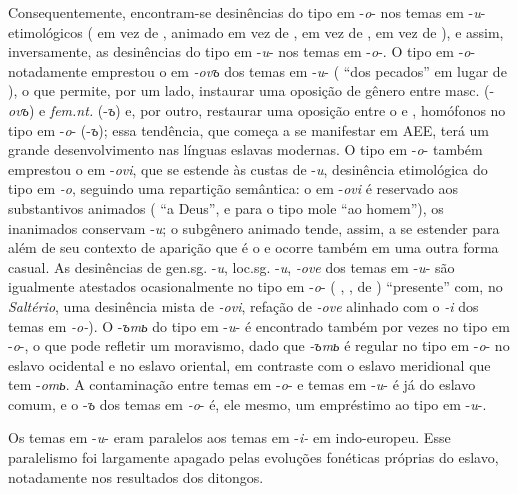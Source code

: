 Consequentemente, encontram-se desinências do tipo em -\emph{o}- nos temas em
-\emph{u}- etimológicos (  em vez de
,  animado  em vez de
,   em vez de
,   em vez de
), e assim, inversamente, as desinências do tipo em
-\emph{u}- nos temas em -\emph{o}-.
O tipo em -\emph{o}- notadamente emprestou o  em
\emph{-ovъ} dos temas em -\emph{u}- ( ``dos
pecados'' em lugar de ), o que permite, por um lado,
instaurar uma oposição de gênero entre masc. (-\emph{ovъ}) e \emph{fem.nt.}
(-\emph{ъ}) e, por outro, restaurar uma oposição entre o
 e , homófonos no tipo em -\emph{o}-
(-\emph{ъ}); essa tendência, que começa a se manifestar em AEE, terá um
grande desenvolvimento nas línguas eslavas modernas. O tipo em
-\emph{o}- também emprestou o  em -\emph{ovi}, que se estende às
custas de -\emph{u}, desinência etimológica do tipo em \emph{-o},
seguindo uma repartição semântica: o  em -\emph{ovi} é reservado aos
substantivos animados ( ``a Deus'', e para o tipo
mole   ``ao homem''), os inanimados conservam
-\emph{u}; o subgênero animado tende, assim, a se estender para além de
seu contexto de aparição que é o  e ocorre também em uma outra
forma casual. As desinências de gen.sg. -\emph{u}, loc.sg. -\emph{u},
 \emph{-ove} dos temas em -\emph{u}- são igualmente atestados
ocasionalmente no tipo em -\emph{o}- ( ,
 , de ) ``presente'' com, no
\emph{Saltério}, uma desinência mista de  \emph{-ovi}, refação de
\emph{-ove} alinhado com o \emph{-i} dos temas em \emph{-o-}). O
 -\emph{ъmь} do tipo em -\emph{u}- é encontrado também por vezes
no tipo em -\emph{o}-, o que pode refletir um moravismo, dado que
\emph{-ъmь} é regular no tipo em -\emph{o}- no eslavo ocidental e no
eslavo oriental, em contraste com o eslavo meridional que tem
-\emph{omь}. A contaminação entre temas em -\emph{o}- e temas em
-\emph{u}- é já do eslavo comum, e o  -\emph{ъ} dos temas em
\emph{-o}- é, ele mesmo, um empréstimo ao tipo em -\emph{u}-.
\clearpage

Os temas em -\emph{u}- eram paralelos aos temas em -\emph{i-} em
indo-europeu. Esse paralelismo foi largamente apagado pelas evoluções
fonéticas próprias do eslavo, notadamente nos resultados dos ditongos.

